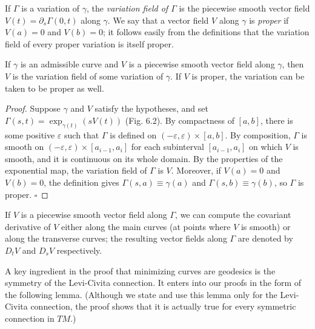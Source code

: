 If $\Gamma$ is a variation of $\gamma$, the \emph{variation field of $\Gamma$} is the piecewise smooth vector field $V(t) = \partial_s\Gamma(0,t)$ along $\gamma$. We say that a vector field $V$ along $\gamma$ is \emph{proper} if $V(a) = 0$ and $V(b) = 0$; it follows easily from the definitions that the variation field of every proper variation is itself proper.


\begin{lemma}
\label{lem:variation-field-existence}

If $\gamma$ is an admissible curve and $V$ is a piecewise smooth vector field along $\gamma$, then $V$ is the variation field of some variation of $\gamma$. If $V$ is proper, the variation can be taken to be proper as well.
\end{lemma}

\begin{proof}
Suppose $\gamma$ and $V$ satisfy the hypotheses, and set $\Gamma(s,t) = \exp_{\gamma(t)}(sV(t))$ (Fig. 6.2). By compactness of $[a,b]$, there is some positive $\varepsilon$ such that $\Gamma$ is defined on $(-\varepsilon, \varepsilon) \times [a,b]$. By composition, $\Gamma$ is smooth on $(-\varepsilon, \varepsilon) \times [a_{i-1}, a_i]$ for each subinterval $[a_{i-1}, a_i]$ on which $V$ is smooth, and it is continuous on its whole domain. By the properties of the exponential map, the variation field of $\Gamma$ is $V$. Moreover, if $V(a) = 0$ and $V(b) = 0$, the definition gives $\Gamma(s, a) \equiv \gamma(a)$ and $\Gamma(s, b) \equiv \gamma(b)$, so $\Gamma$ is proper. $\square$
\end{proof}

If $V$ is a piecewise smooth vector field along $\Gamma$, we can compute the covariant derivative of $V$ either along the main curves (at points where $V$ is smooth) or along the transverse curves; the resulting vector fields along $\Gamma$ are denoted by $D_t V$ and $D_s V$ respectively.

A key ingredient in the proof that minimizing curves are geodesics is the symmetry of the Levi-Civita connection. It enters into our proofs in the form of the following lemma. (Although we state and use this lemma only for the Levi-Civita connection, the proof shows that it is actually true for every symmetric connection in $TM$.)

